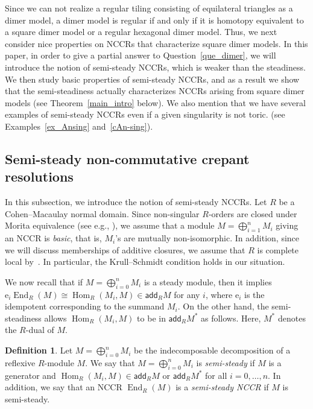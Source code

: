 \documentclass[11pt]{amsart}
\theoremstyle{definition}
\newtheorem{defi}[theo]{Definition}
\newcommand{\rme}{\mathrm{e}}
\DeclareMathOperator{\Hom}{Hom}
\DeclareMathOperator{\End}{End}
\newcommand{\add}{\mathsf{add}}
\begin{document}
Since we can not realize a regular tiling consisting of equilateral triangles as a dimer model, a dimer model is regular if and only if it is homotopy equivalent to a square dimer model or a regular hexagonal dimer model. Thus, we next consider nice properties on NCCRs that characterize square dimer models. In this paper, in order to give a partial answer to Question~\ref{que_dimer}, we will introduce the notion of semi-steady NCCRs, which is weaker than the steadiness. We then study basic properties of semi-steady NCCRs, and as a result we show that the semi-steadiness actually characterizes NCCRs arising from square dimer models (see Theorem~\ref{main_intro} below). We also mention that we have several examples of semi-steady NCCRs even if a given singularity is not toric. (see Examples~\ref{ex_Ansing} and~\ref{cAn-sing}).

\subsection{Semi-steady non-commutative crepant resolutions}\label{subsec_intro}

In this subsection, we introduce the notion of semi-steady NCCRs. Let $R$ be a Cohen--Macaulay normal domain. Since non-singular $R$-orders are closed under Morita equivalence (see e.g., \cite[Lemma~2.13]{IW2}), we assume that a module $M=\bigoplus^n_{i=1}M_i$ giving an NCCR is \emph{basic}, that is, $M_i$'s are mutually non-isomorphic. In addition, since we will discuss memberships of additive closures, we assume that $R$ is complete local by~\cite[Proposition~2.26]{IW2}. In particular, the Krull--Schmidt condition holds in our situation.

We now recall that if $M=\bigoplus_{i=0}^nM_i$ is a steady module, then it implies $\rme_i\End_R(M)\cong\Hom_R(M_i,M)\in\add_RM$ for any $i$, where $\rme_i$ is the idempotent corresponding to the summand $M_i$. On the other hand, the semi-steadiness allows $\Hom_R(M_i,M)$ to be in $\add_RM^*$ as follows. Here, $M^*$ denotes the $R$-dual of $M$.

\begin{defi}\label{def_semisteady}
Let $M=\bigoplus_{i=0}^nM_i$ be the indecomposable decomposition of a reflexive $R$-module $M$. We say that $M=\bigoplus_{i=0}^nM_i$ is \emph{semi-steady} if $M$ is a generator and $\Hom_R(M_i,M)\in\add_RM$ or $\add_RM^*$ for all $i=0,\dots,n$. In addition, we say that an NCCR $\End_R(M)$ is a \emph{semi-steady NCCR} if $M$ is semi-steady.
\end{defi}
\end{document}
